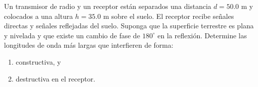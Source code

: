 \item Un transmisor de radio y un receptor están separados una distancia $d = 50.0\text{ m}$ y colocados a una altura $h = 35.0\text{ m}$ sobre el suelo. El receptor recibe señales directas y señales reflejadas del suelo. Suponga que la superficie terrestre es plana y nivelada y que existe un cambio de fase de $180^\circ$ en la reflexión. Determine las longitudes de onda más largas que interfieren de forma:
\begin{enumerate}
    \item constructiva, y
    \item destructiva en el receptor.
\end{enumerate}
